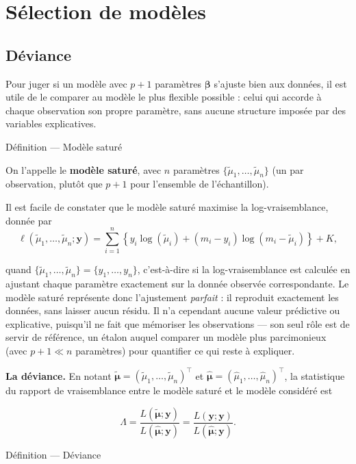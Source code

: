 \documentclass[
  french,
  letterpaper,
  DIV=11,
  numbers=noendperiod]{scrreprt}
\begin{document}
\section{Sélection de modèles}\label{suxe9lection-de-moduxe8les}

\subsection{Déviance}\label{sec-deviance}

Pour juger si un modèle avec \(p+1\) paramètres \(\boldsymbol\beta\)
s'ajuste bien aux données, il est utile de le comparer au modèle le plus
flexible possible : celui qui accorde à chaque observation son propre
paramètre, sans aucune structure imposée par des variables explicatives.

{Définition --- Modèle saturé}

On l'appelle le \textbf{modèle saturé}, avec \(n\) paramètres
\(\{\tilde\mu_1,\ldots,\tilde\mu_n\}\) (un par observation, plutôt que
\(p+1\) pour l'ensemble de l'échantillon).

Il est facile de constater que le modèle saturé maximise la
log-vraisemblance, donnée par \[
\ell(\tilde\mu_1,\ldots,\tilde\mu_n; \boldsymbol{y}) = \sum_{i=1}^n \left\{ y_i \log(\tilde\mu_i) + (m_i - y_i)\log(m_i - \tilde\mu_i) \right\} + K,
\]

quand \(\{\tilde\mu_1,\ldots,\tilde\mu_n\}= \{y_1,\ldots,y_n\}\),
c'est-à-dire si la log-vraisemblance est calculée en ajustant chaque
paramètre exactement sur la donnée observée correspondante. Le modèle
saturé représente donc l'ajustement \emph{parfait} : il reproduit
exactement les données, sans laisser aucun résidu. Il n'a cependant
aucune valeur prédictive ou explicative, puisqu'il ne fait que mémoriser
les observations --- son seul rôle est de servir de référence, un étalon
auquel comparer un modèle plus parcimonieux (avec \(p+1 \ll n\)
paramètres) pour quantifier ce qui reste à expliquer.

\textbf{La déviance.} En notant
\(\tilde{\boldsymbol{\mu}}=(\tilde\mu_1,\ldots,\tilde\mu_n)^\top\) et
\(\hat{\boldsymbol{\mu}}=(\hat\mu_1,\ldots,\hat\mu_n)^\top\), la
statistique du rapport de vraisemblance entre le modèle saturé et le
modèle considéré est

\[\Lambda=\frac{L(\tilde{\boldsymbol{\mu}}; \boldsymbol y)}{L(\hat{\boldsymbol{\mu}}; \boldsymbol y)} =\frac{L(\boldsymbol{y}; \boldsymbol y)}{L(\hat{\boldsymbol{\mu}}; \boldsymbol y)}.\]

{Définition --- Déviance}
\end{document}

